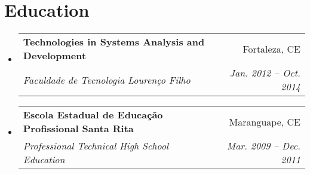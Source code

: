 \documentclass[letterpaper,11pt]{article}
\makeatletter
\newcommand{\resumeItem}[2]{
  \item\small{
    \textbf{#1}{: #2 \vspace{-2pt}}
  }
}
\newcommand{\resumeSubheading}[4]{
  \vspace{-1pt}\item
    \begin{tabular*}{0.97\textwidth}[t]{l@{\extracolsep{\fill}}r}
      \textbf{#1} & #2 \\
      \textit{\small#3} & \textit{\small #4} \\
    \end{tabular*}\vspace{-5pt}
}
\newcommand{\resumeSubSubheading}[2]{
    \begin{tabular*}{0.97\textwidth}{l@{\extracolsep{\fill}}r}
      \textit{\small#1} & \textit{\small #2} \\
    \end{tabular*}\vspace{-5pt}
}
\newcommand{\resumeSubItem}[2]{\resumeItem{#1}{#2}\vspace{-4pt}}
\newcommand{\resumeSubHeadingListStart}{\begin{itemize}[leftmargin=*]}
\newcommand{\resumeSubHeadingListEnd}{\end{itemize}}
\newcommand{\resumeItemListStart}{\begin{itemize}}
\newcommand{\resumeItemListEnd}{\end{itemize}\vspace{-5pt}}
\makeatother
\begin{document}
\section{Education}
  \resumeSubHeadingListStart
    \resumeSubheading
      {Technologies in Systems Analysis and Development}{Fortaleza, CE}
      {Faculdade de Tecnologia Lourenço Filho}{Jan. 2012 -- Oct. 2014}
    \resumeSubheading
      {Escola Estadual de Educação Profissional Santa Rita}{Maranguape, CE}
      {Professional Technical High School Education}{Mar. 2009 -- Dec. 2011}
  \resumeSubHeadingListEnd


%
%
\end{document}
